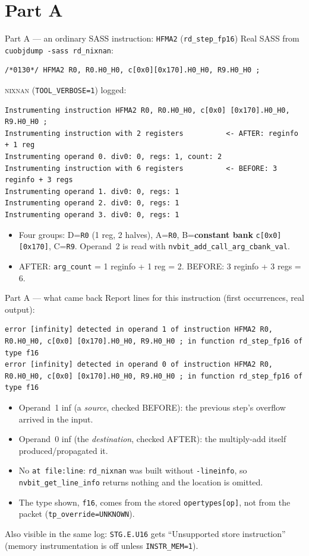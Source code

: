 \documentclass[aspectratio=169,10pt]{beamer}
\newcommand{\nn}{\textsc{nixnan}}
\begin{document}
\section{Part A}
\begin{frame}[fragile]{Part A --- an ordinary SASS instruction: \texttt{HFMA2} (\texttt{rd\_step\_fp16})}
\small Real SASS from \texttt{cuobjdump -sass rd\_nixnan}:
\begin{lstlisting}
/*0130*/ HFMA2 R0, R0.H0_H0, c[0x0][0x170].H0_H0, R9.H0_H0 ;
\end{lstlisting}
\nn{} (\texttt{TOOL\_VERBOSE=1}) logged:
\begin{lstlisting}
Instrumenting instruction HFMA2 R0, R0.H0_H0, c[0x0] [0x170].H0_H0, R9.H0_H0 ;
Instrumenting instruction with 2 registers          <- AFTER: reginfo + 1 reg
Instrumenting operand 0. div0: 0, regs: 1, count: 2
Instrumenting instruction with 6 registers          <- BEFORE: 3 reginfo + 3 regs
Instrumenting operand 1. div0: 0, regs: 1
Instrumenting operand 2. div0: 0, regs: 1
Instrumenting operand 3. div0: 0, regs: 1
\end{lstlisting}
\begin{itemize}\small
\item Four groups: D=\texttt{R0} (1 reg, 2 halves), A=\texttt{R0}, B=\textbf{constant bank} \texttt{c[0x0][0x170]}, C=\texttt{R9}. Operand~2 is read with \texttt{nvbit\_add\_call\_arg\_cbank\_val}.
\item AFTER: \texttt{arg\_count} = 1 reginfo + 1 reg = 2. BEFORE: 3 reginfo + 3 regs = 6.
\end{itemize}
\end{frame}

\begin{frame}[fragile]{Part A --- what came back}
\small Report lines for this instruction (first occurrences, real output):
\begin{lstlisting}
error [infinity] detected in operand 1 of instruction HFMA2 R0, R0.H0_H0, c[0x0] [0x170].H0_H0, R9.H0_H0 ; in function rd_step_fp16 of type f16
error [infinity] detected in operand 0 of instruction HFMA2 R0, R0.H0_H0, c[0x0] [0x170].H0_H0, R9.H0_H0 ; in function rd_step_fp16 of type f16
\end{lstlisting}
\begin{itemize}\small
\item Operand~1 inf (a \emph{source}, checked BEFORE): the previous step's overflow arrived in the input.
\item Operand~0 inf (the \emph{destination}, checked AFTER): the multiply-add itself produced/propagated it.
\item No \texttt{at file:line}: \texttt{rd\_nixnan} was built without \texttt{-lineinfo}, so \texttt{nvbit\_get\_line\_info} returns nothing and the location is omitted.
\item The type shown, \texttt{f16}, comes from the stored \texttt{opertypes[op]}, not from the packet (\texttt{tp\_override=UNKNOWN}).
\end{itemize}
Also visible in the same log: \texttt{STG.E.U16} gets ``Unsupported store instruction'' (memory instrumentation is off unless \texttt{INSTR\_MEM=1}).
\end{frame}
\end{document}
